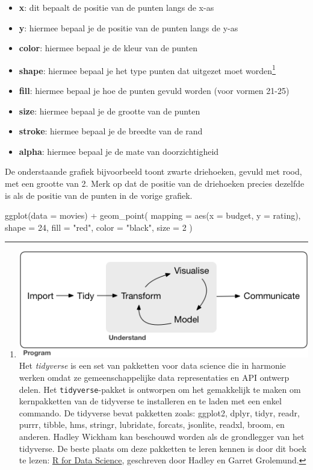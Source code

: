 \documentclass[]{tufte-book}
\newenvironment{Shaded}{}{}
\newcommand{\AttributeTok}[1]{\textcolor[rgb]{0.49,0.56,0.16}{#1}}
\newcommand{\DecValTok}[1]{\textcolor[rgb]{0.25,0.63,0.44}{#1}}
\newcommand{\FunctionTok}[1]{\textcolor[rgb]{0.02,0.16,0.49}{#1}}
\newcommand{\NormalTok}[1]{#1}
\newcommand{\SpecialCharTok}[1]{\textcolor[rgb]{0.25,0.44,0.63}{#1}}
\newcommand{\StringTok}[1]{\textcolor[rgb]{0.25,0.44,0.63}{#1}}
\providecommand{\tightlist}{%
  \setlength{\itemsep}{0pt}\setlength{\parskip}{0pt}}
\begin{document}
\begin{itemize}
\tightlist
\item
  \textbf{x}: dit bepaalt de positie van de punten langs de x-as
\item
  \textbf{y}: hiermee bepaal je de positie van de punten langs de y-as
\item
  \textbf{color}: hiermee bepaal je de kleur van de punten
\item
  \textbf{shape}: hiermee bepaal je het type punten dat uitgezet moet worden\footnote{\includegraphics{images/tidyverse.png} Het \emph{tidyverse} is een set van pakketten voor data science die in harmonie werken omdat ze gemeenschappelijke data representaties en API ontwerp delen. Het \texttt{tidyverse}-pakket is ontworpen om het gemakkelijk te maken om kernpakketten van de tidyverse te installeren en te laden met een enkel commando. De tidyverse bevat pakketten zoals: ggplot2, dplyr, tidyr, readr, purrr, tibble, hms, stringr, lubridate, forcats, jsonlite, readxl, broom, en anderen. Hadley Wickham kan beschouwd worden als de grondlegger van het tidyverse. De beste plaats om deze pakketten te leren kennen is door dit boek te lezen: \href{http://r4ds.had.co.nz/}{R for Data Science}, geschreven door Hadley en Garret Grolemund.}
\item
  \textbf{fill}: hiermee bepaal je hoe de punten gevuld worden (voor vormen 21-25)
\item
  \textbf{size}: hiermee bepaal je de grootte van de punten
\item
  \textbf{stroke}: hiermee bepaal je de breedte van de rand
\item
  \textbf{alpha}: hiermee bepaal je de mate van doorzichtigheid
\end{itemize}

De onderstaande grafiek bijvoorbeeld toont zwarte driehoeken, gevuld met rood, met een grootte van 2. Merk op dat de positie van de driehoeken precies dezelfde is als de positie van de punten in de vorige grafiek.

\begin{Shaded}
\begin{Highlighting}[]
\FunctionTok{ggplot}\NormalTok{(}\AttributeTok{data =}\NormalTok{ movies) }\SpecialCharTok{+}
  \FunctionTok{geom\_point}\NormalTok{(}
    \AttributeTok{mapping =} \FunctionTok{aes}\NormalTok{(}\AttributeTok{x =}\NormalTok{ budget, }\AttributeTok{y =}\NormalTok{ rating),}
    \AttributeTok{shape =} \DecValTok{24}\NormalTok{,}
    \AttributeTok{fill =} \StringTok{"red"}\NormalTok{,}
    \AttributeTok{color =} \StringTok{"black"}\NormalTok{,}
    \AttributeTok{size =} \DecValTok{2}
\NormalTok{  )}
\end{Highlighting}
\end{Shaded}
\end{document}
